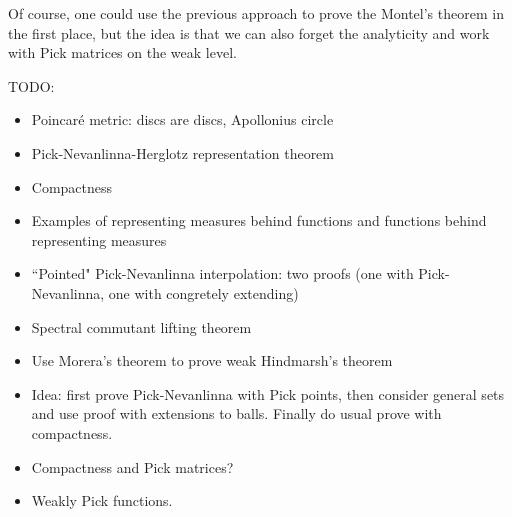 Of course, one could use the previous approach to prove the Montel's theorem in the first place, but the idea is that we can also forget the analyticity and work with Pick matrices on the weak level.

TODO:
\begin{itemize}
	\item Poincaré metric: discs are discs, Apollonius circle
	\item Pick-Nevanlinna-Herglotz representation theorem
	\item Compactness
	\item Examples of representing measures behind functions and functions behind representing measures
	\item ``Pointed" Pick-Nevanlinna interpolation: two proofs (one with Pick-Nevanlinna, one with congretely extending)
	\item Spectral commutant lifting theorem
	\item Use Morera's theorem to prove weak Hindmarsh's theorem
	\item Idea: first prove Pick-Nevanlinna with Pick points, then consider general sets and use proof with extensions to balls. Finally do usual prove with compactness.
	\item Compactness and Pick matrices?
	\item Weakly Pick functions.
\end{itemize}

